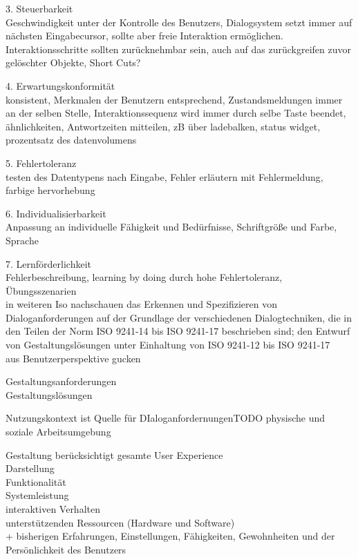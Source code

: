 3. Steuerbarkeit\\
 	Geschwindigkeit unter der Kontrolle des Benutzers, Dialogsystem setzt immer auf nächsten Eingabecursor, sollte aber freie Interaktion ermöglichen. Interaktionsschritte sollten zurücknehmbar sein, auch auf das zurückgreifen zuvor gelöschter Objekte, Short Cuts?

 4. Erwartungskonformität\\
 	konsistent, Merkmalen der Benutzern entsprechend, Zustandsmeldungen immer an der selben Stelle, Interaktionssequenz wird immer durch selbe Taste beendet, ähnlichkeiten, Antwortzeiten mitteilen, zB über ladebalken, status widget, prozentsatz des datenvolumens

 5. Fehlertoleranz\\
 	testen des Datentypens nach Eingabe, Fehler erläutern mit Fehlermeldung, farbige hervorhebung 

 6. Individualisierbarkeit\\
 	Anpassung an individuelle Fähigkeit und Bedürfnisse, Schriftgröße und Farbe, Sprache

 7. Lernförderlichkeit\\
 	Fehlerbeschreibung, learning by doing durch hohe Fehlertoleranz, Übungsszenarien\\

 	in weiteren Iso nachschauen
 	das Erkennen und Spezifizieren von Dialoganforderungen auf der Grundlage der verschiedenen Dialogtechniken, die in den Teilen der Norm ISO 9241-14 bis ISO 9241-17 beschrieben sind;
 den Entwurf von Gestaltungslösungen unter Einhaltung von ISO 9241-12 bis ISO 9241-17\\

 aus Benutzerperspektive gucken

 Gestaltungsanforderungen\\
 Gestaltungslösungen

 Nutzungskontext ist Quelle für DIaloganfordernungenTODO physische und soziale Arbeitsumgebung

 Gestaltung berücksichtigt gesamte User Experience\\
 Darstellung\\
 Funktionalität\\
 Systemleistung\\
 interaktiven Verhalten\\
 unterstützenden Ressourcen (Hardware und Software)\\
 + bisherigen Erfahrungen, Einstellungen, Fähigkeiten, Gewohnheiten und der Persönlichkeit des Benutzers\\

